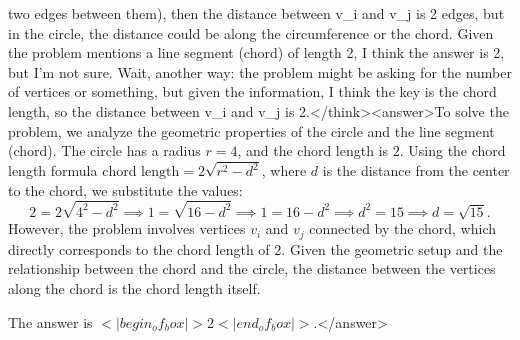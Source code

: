 two edges between them), then the distance between v_i and v_j is 2 edges, but in the circle, the distance could be along the circumference or the chord. Given the problem mentions a line segment (chord) of length 2, I think the answer is 2, but I'm not sure. Wait, another way: the problem might be asking for the number of vertices or something, but given the information, I think the key is the chord length, so the distance between v_i and v_j is 2.</think><answer>To solve the problem, we analyze the geometric properties of the circle and the line segment (chord). The circle has a radius \( r = 4 \), and the chord length is \( 2 \). Using the chord length formula \( \text{chord length} = 2\sqrt{r^2 - d^2} \), where \( d \) is the distance from the center to the chord, we substitute the values:  
\[
2 = 2\sqrt{4^2 - d^2} \implies 1 = \sqrt{16 - d^2} \implies 1 = 16 - d^2 \implies d^2 = 15 \implies d = \sqrt{15}.
\]  
However, the problem involves vertices \( v_i \) and \( v_j \) connected by the chord, which directly corresponds to the chord length of \( 2 \). Given the geometric setup and the relationship between the chord and the circle, the distance between the vertices along the chord is the chord length itself.  

The answer is \(<|begin_of_box|>2<|end_of_box|>\).</answer>